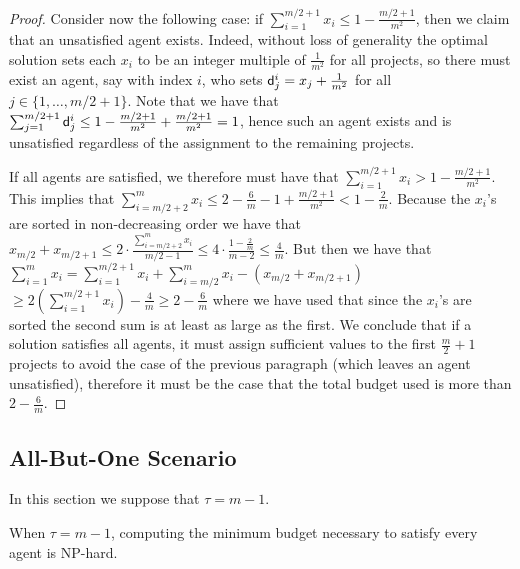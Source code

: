 \documentclass{article}
\begin{document}
\begin{proof}
Consider now the following case: if $\sum_{i=1}^{m/2+1} x_i \le 
1-\frac{m/2+1}{m^2}$, then we claim that an unsatisfied agent exists.  Indeed,
without loss of generality the optimal solution sets each $x_i$ to be an
integer multiple of $\frac{1}{m^2}$ for all projects, so there must exist an
agent, say with index $i$, who sets ${\sf d}^i_j=x_j+\frac{1}{m^2}$ for all
$j\in\{1,\ldots,m/2+1\}$.  
Note that we have that $\sum_{j=1}^{m/2+1}{\sf d}^i_j \le
1-\frac{m/2+1}{m^2}+\frac{m/2+1}{m^2} = 1$, hence such an agent exists and is
unsatisfied regardless of the assignment to the remaining projects.

If all agents are satisfied, we therefore must have that $\sum_{i=1}^{m/2+1} x_i > 1-\frac{m/2+1}{m^2}$.
This implies that $\sum_{i=m/2+2}^m x_i \le 2-\frac{6}{m}-1+\frac{m/2+1}{m^2} <
1- \frac{2}{m}$. Because the $x_i$'s are sorted in non-decreasing order we have
that $x_{m/2}+x_{m/2+1}\le 2\cdot \frac{\sum_{i=m/2+2}^m x_i}{m/2-1}\le 4\cdot
\frac{1-\frac{2}{m}}{m-2} \le \frac{4}{m}$.  But then we have that 
$\sum_{i=1}^m x_i = \sum_{i=1}^{m/2+1} x_i + \sum_{i=m/2}^{m} x_i -
(x_{m/2}+x_{m/2+1})$ $\ge 2\left(\sum_{i=1}^{m/2+1} x_i\right) - \frac{4}{m} \ge 2-\frac{6}{m}$
where we have used that since the $x_i$'s are sorted the second sum
is at least as large as the first. We conclude that if a solution satisfies all agents, it must assign sufficient values to the first $\frac{m}{2}+1$ projects to avoid the case of the previous paragraph (which leaves an agent unsatisfied), therefore it must be the case that the total budget used is more than $2-\frac{6}{m}$. \end{proof}


\begin{comment}
\begin{eqnarray*}
\sum_{i=1}^m x_i &=& \sum_{i=1}^{m/2+1} x_i + \sum_{i=m/2}^{m} x_i -
(x_{m/2}+x_{m/2+1})\\ 
&\ge& 2\left(\sum_{i=1}^{m/2+1} x_i\right) - \frac{4}{m} \ge 2-\frac{6}{m}
\end{eqnarray*}
\end{comment}





\subsection{All-But-One Scenario}

In this section we suppose that $\tau=m-1$.

\begin{theorem} \label{thm:5.3} When $\tau=m-1$, computing the minimum budget necessary to satisfy every agent is NP-hard.  \end{theorem}
\end{document}
